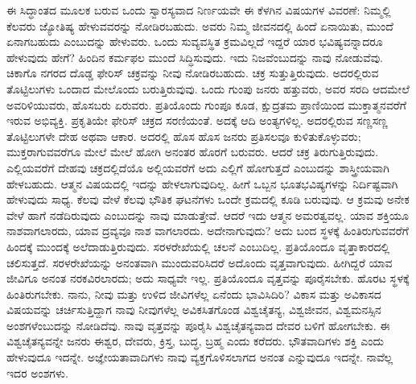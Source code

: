 ಈ ಸಿದ್ಧಾಂತದ ಮೂಲಕ ಬರುವ ಒಂದು ಸ್ವಾರಸ್ಯವಾದ ನಿರ್ಣಯವೇ ಈ ಕೆಳಗಿನ ವಿಷಯಗಳ ವಿವರಣೆ: ನಿಮ್ಮಲ್ಲಿ ಕೆಲವರು ಜ್ಯೋತಿಷ್ಯ ಹೇಳುವವರನ್ನು ನೋಡಿರಬಹುದು. ಅವರು ನಿಮ್ಮ ಜೀವನದಲ್ಲಿ ಹಿಂದೆ ಏನಾಯಿತು, ಮುಂದೆ ಏನಾಗಬಹುದು ಎಂಬುದನ್ನು ಹೇಳುವರು. ಒಂದು ಸುವ್ಯವಸ್ಥಿತ ಕ್ರಮವಿಲ್ಲದೆ ಇದ್ದರೆ ಯಾರ ಭವಿಷ್ಯವನ್ನಾದರೂ ಹೇಳುವುದು ಹೇಗೆ? ಹಿಂದಿನ ಕರ್ಮಫಲ ಮುಂದೆ ಸಿದ್ಧಿಸುವುದು. ಇದು ನಿಜವೆಂಬುದನ್ನು ನಾವು ನೋಡುವೆವು. ಚಿಕಾಗೊ ನಗರದ ದೊಡ್ಡ ಫೇರಿಸ್​ ಚಕ್ರವನ್ನು ನೀವು ನೋಡಿರಬಹುದು. ಚಕ್ರ ಸುತ್ತುತ್ತಿರುವುದು. ಅದರಲ್ಲಿರುವ ತೊಟ್ಟಿಲುಗಳು ಒಂದಾದ ಮೇಲೊಂದು ಬರುತ್ತಿರುವುವು. ಒಂದು ಗುಂಪು ಜನರು ಹತ್ತುವರು, ಅವರ ಸರದಿ ಆದಮೇಲೆ ಅವರಿಳಿಯುವರು, ಹೊಸಬರು ಏರುವರು. ಪ್ರತಿಯೊಂದು ಗುಂಪೂ ಕೂಡ, ಕ್ಷುದ್ರತಮ ಪ್ರಾಣಿಯಿಂದ ಮುಕ್ತಾತ್ಮನವರೆಗೆ ಇರುವ ಅಭಿವ್ಯಕ್ತಿ. ಪ್ರಕೃತಿಯೇ ಫೇರಿಸ್​ ಚಕ್ರದ ಸರಣಿಯಂತೆ. ಅದಕ್ಕೆ ಆದಿ ಅಂತ್ಯಗಳಿಲ್ಲ. ಅದರಲ್ಲಿರುವ ಸಣ್ಣಸಣ್ಣ ತೊಟ್ಟಿಲುಗಳೇ ದೇಹ ಅಥವಾ ಆಕಾರ. ಅದರಲ್ಲಿ ಹೊಸ ಹೊಸ ಜನರು ಪ್ರತಿಸಲವೂ ಕುಳಿತುಕೊಳ್ಳುವರು; ಮುಕ್ತರಾಗುವವರೆಗೂ ಮೇಲೆ ಮೇಲೆ ಹೋಗಿ ಅನಂತರ ಹೊರಗೆ ಬರುವರು. ಆದರೆ ಚಕ್ರ ತಿರುಗುತ್ತಿರುವುದು. ಎಲ್ಲಿಯವರೆಗೆ ದೇಹವು ಚಕ್ರದಲ್ಲಿದೆಯೊ ಅಲ್ಲಿಯವರೆಗೆ ಅದು ಎಲ್ಲಿಗೆ ಹೋಗುತ್ತದೆ ಎಂಬುದನ್ನು ಶಾಸ್ತ್ರೀಯವಾಗಿ ಹೇಳಬಹುದು. ಆತ್ಮನ ವಿಷಯದಲ್ಲಿ ಇದನ್ನು ಹೇಳಲಾಗುವುದಿಲ್ಲ. ಹೀಗೆ ಒಬ್ಬನ ಭೂತಭವಿಷ್ಯಗಳನ್ನು ನಿರ್ದಿಷ್ಟವಾಗಿ ಹೇಳುವುದು ಸಾಧ್ಯ. ಕೆಲವು ವೇಳೆ ಕೆಲವು ಭೌತಿಕ ಘಟನೆಗಳು ಒಂದೇ ಕ್ರಮದಲ್ಲಿ ಕೂಡಿ ಬರುವುವು. ಆ ಕ್ರಮವು ಅನೇಕ ವೇಳೆ ಹಾಗೆ ನಡೆದಿರುವುದು ಎಂಬುದನ್ನು ನಾವು ಮಾಡುತ್ತೇವೆ. ಆದರೆ ಇದು ಆತ್ಮನ ಅಮರತ್ವವಲ್ಲ. ಯಾವ ಶಕ್ತಿಯೂ ನಾಶವಾಗಲಾರದು, ಯಾವ ದ್ರವ್ಯವೂ ನಾಶ ವಾಗಲಾರದು. ಅದೇನಾಗುವುದು? ಅದು ಬಂದ ಸ್ಥಳಕ್ಕೆ ಹಿಂತಿರುಗುವವರೆಗೆ ಹಿಂದಕ್ಕೆ ಮುಂದಕ್ಕೆ ಅಲೆದಾಡುತ್ತಿರುವುದು. ಸರಳರೇಖೆಯಲ್ಲಿ ಚಲನೆ ಎಂಬುದಿಲ್ಲ. ಪ್ರತಿಯೊಂದೂ ವೃತ್ತಾಕಾರದಲ್ಲಿ ಚಲಿಸುತ್ತದೆ. ಸರಳರೇಖೆಯನ್ನು ಅನಂತವಾಗಿ ಮುಂದುವರಿಸಿದರೆ ಅದೊಂದು ವೃತ್ತವಾಗುವುದು. ಹೀಗಿದ್ದರೆ ಯಾವ ಜೀವಿಗೂ ಅನಂತ ನರಕವಿರಲಾರದು; ಅದು ಸಾಧ್ಯವೇ ಇಲ್ಲ. ಪ್ರತಿಯೊಂದೂ ವೃತ್ತವನ್ನು ಪೂರೈಸಬೇಕು. ಹೊರಟ ಸ್ಥಳಕ್ಕೆ ಹಿಂತಿರುಗಬೇಕು. ನಾನು, ನೀವು ಮತ್ತು ಉಳಿದ ಜೀವಿಗಳೆಲ್ಲ ಏನೆಂದು ಭಾವಿಸಿದಿರಿ? ವಿಕಾಸ ಮತ್ತು ಅವಿಕಾಸದ ವಿಷಯವನ್ನು ಚರ್ಚಿಸುತ್ತಿದ್ದಾಗ ನಾವು ನೀವುಗಳೆಲ್ಲ ಅವಿಕಸಿತಗೊಂಡ ವಿಶ್ವಚೈತನ್ಯ, ವಿಶ್ವಜೀವನ, ವಿಶ್ವಮನಸ್ಸಿನ ಅಂಶಗಳೆಂಬುದನ್ನು ನೋಡಿದೆವು. ನಾವು ವೃತ್ತವನ್ನು ಪೂರೈಸಿ ವಿಶ್ವಚೈತನ್ಯವಾದ ದೇವರ ಬಳಿಗೆ ಹೋಗಬೇಕು. ಈ ವಿಶ್ವಚೈತನ್ಯವನ್ನೇ ಜನರು ಈಶ್ವರ, ದೇವರು, ಕ್ರಿಸ್ತ, ಬುದ್ಧ, ಬ್ರಹ್ಮ ಎಂದು ಕರೆದರು. ಭೌತವಾದಿಗಳು ಶಕ್ತಿ ಎಂದು ಹೇಳುವುದೂ ಇದನ್ನೇ. ಅಜ್ಞೇಯತಾವಾದಿಗಳು ನಾವು ವ್ಯಕ್ತಗೊಳಿಸಲಾಗದ ಅನಂತ ಎನ್ನುವುದೂ ಇದನ್ನೇ. ನಾವೆಲ್ಲ ಇದರ ಅಂಶಗಳು.

